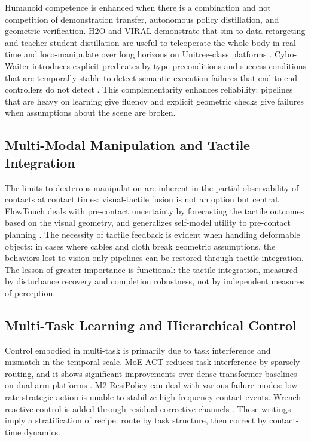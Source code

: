 \documentclass[11pt,a4paper]{article}
\begin{document}
Humanoid competence is enhanced when there is a combination and not competition of demonstration transfer, autonomous policy distillation, and geometric verification. H2O and VIRAL demonstrate that sim-to-data retargeting and teacher-student distillation are useful to teleoperate the whole body in real time and loco-manipulate over long horizons on Unitree-class platforms \cite{he2024h2o,he2024viral}. Cybo-Waiter introduces explicit predicates by type preconditions and success conditions that are temporally stable to detect semantic execution failures that end-to-end controllers do not detect \cite{ren2026cybowaiter}. This complementarity enhances reliability: pipelines that are heavy on learning give fluency and explicit geometric checks give failures when assumptions about the scene are broken.

\subsection{Multi-Modal Manipulation and Tactile Integration}

The limits to dexterous manipulation are inherent in the partial observability of contacts at contact times: visual-tactile fusion is not an option but central. FlowTouch deals with pre-contact uncertainty by forecasting the tactile outcomes based on the visual geometry, and generalizes self-model utility to pre-contact planning \cite{li2024flowtouch}. The necessity of tactile feedback is evident when handling deformable objects: in cases where cables and cloth break geometric assumptions, the behaviors lost to vision-only pipelines can be restored through tactile integration. The lesson of greater importance is functional: the tactile integration, measured by disturbance recovery and completion robustness, not by independent measures of perception.

\subsection{Multi-Task Learning and Hierarchical Control}

Control embodied in multi-task is primarily due to task interference and mismatch in the temporal scale. MoE-ACT reduces task interference by sparsely routing, and it shows significant improvements over dense transformer baselines on dual-arm platforms \cite{guo2026moeact}. M2-ResiPolicy can deal with various failure modes: low-rate strategic action is unable to stabilize high-frequency contact events. Wrench-reactive control is added through residual corrective channels \cite{li2025m2resipolicy}. These writings imply a stratification of recipe: route by task structure, then correct by contact-time dynamics.
\end{document}
